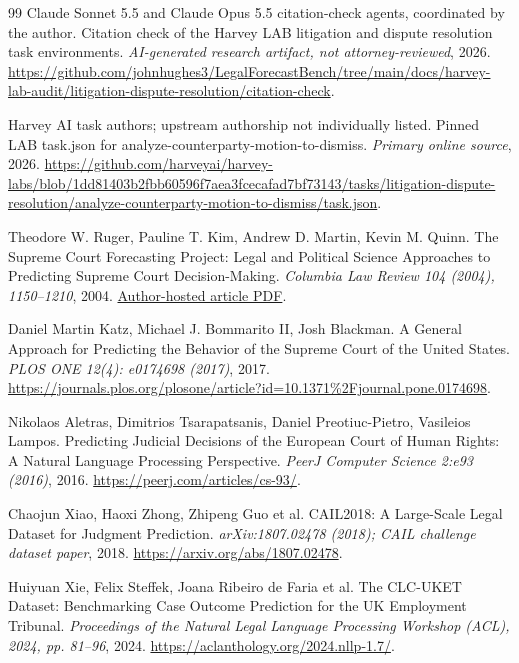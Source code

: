 \documentclass[11pt]{article}
\begin{document}
\begin{thebibliography}{99}
 Claude Sonnet 5.5 and Claude Opus 5.5 citation-check agents, coordinated by the author. Citation check of the Harvey LAB litigation and dispute resolution task environments. \emph{AI-generated research artifact, not attorney-reviewed}, 2026. \url{https://github.com/johnhughes3/LegalForecastBench/tree/main/docs/harvey-lab-audit/litigation-dispute-resolution/citation-check}.

 Harvey AI task authors; upstream authorship not individually listed. Pinned LAB task.json for analyze-counterparty-motion-to-dismiss. \emph{Primary online source}, 2026. \url{https://github.com/harveyai/harvey-labs/blob/1dd81403b2fbb60596f7aea3fcecafad7bf73143/tasks/litigation-dispute-resolution/analyze-counterparty-motion-to-dismiss/task.json}.

 Theodore W. Ruger, Pauline T. Kim, Andrew D. Martin, Kevin M. Quinn. The Supreme Court Forecasting Project: Legal and Political Science Approaches to Predicting Supreme Court Decision-Making. \emph{Columbia Law Review 104 (2004), 1150--1210}, 2004. \href{https://andrewdmartin.wustl.edu/app/uploads/2019/01/The-Supreme-Court-Forecasting-Project-Legal-and-Political-Science-Approaches-to-Predicting-Supreme-Court-Decision-Making-2bvpcdb.pdf}{Author-hosted article PDF}.

 Daniel Martin Katz, Michael J. Bommarito II, Josh Blackman. A General Approach for Predicting the Behavior of the Supreme Court of the United States. \emph{PLOS ONE 12(4): e0174698 (2017)}, 2017. \url{https://journals.plos.org/plosone/article?id=10.1371%2Fjournal.pone.0174698}.

 Nikolaos Aletras, Dimitrios Tsarapatsanis, Daniel Preotiuc-Pietro, Vasileios Lampos. Predicting Judicial Decisions of the European Court of Human Rights: A Natural Language Processing Perspective. \emph{PeerJ Computer Science 2:e93 (2016)}, 2016. \url{https://peerj.com/articles/cs-93/}.

 Chaojun Xiao, Haoxi Zhong, Zhipeng Guo et al. CAIL2018: A Large-Scale Legal Dataset for Judgment Prediction. \emph{arXiv:1807.02478 (2018); CAIL challenge dataset paper}, 2018. \url{https://arxiv.org/abs/1807.02478}.

 Huiyuan Xie, Felix Steffek, Joana Ribeiro de Faria et al. The CLC-UKET Dataset: Benchmarking Case Outcome Prediction for the UK Employment Tribunal. \emph{Proceedings of the Natural Legal Language Processing Workshop (ACL), 2024, pp. 81--96}, 2024. \url{https://aclanthology.org/2024.nllp-1.7/}.


\end{thebibliography}
\end{document}
